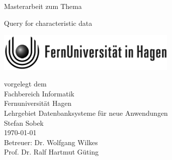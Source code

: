 \begin{titlepage}
\vspace{4em}
\center
 \Large{\textsf{Masterarbeit zum Thema}}
 \vspace{1em}

\Huge{\textsf{Query for characteristic data}}
\vspace{1em}
\\
\begin{center}
	\includegraphics[width=0.65\textwidth]{images/feulogo.pdf}
\end{center}

\vspace{1em}
\Large{
\textsf{
vorgelegt dem\\
Fachbereich Informatik\\Fernuniversität Hagen\\Lehrgebiet Datenbanksysteme für neue Anwendungen
}
}
\vspace{2em}
\\
\Large{
\textsf{
Stefan Sobek\\
\today
\vspace{2em}
\\
Betreuer: Dr. Wolfgang Wilkes\\
Prof. Dr. Ralf Hartmut Güting \\
}
}
\end{titlepage}
